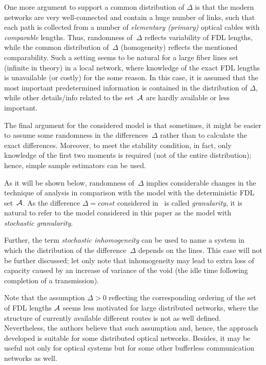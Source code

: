 \begin{multicols}{2}
One more argument to
support a common distribution of $\Delta$ is that the modern
networks are very well-connected and contain a huge number of links,
such that  each path is collected from a number of {\it
elementary (primary)} optical cables with {\it comparable} lengths.
Thus, randomness of~$\Delta$ reflects  variability  of FDL
lengths, while  the common distribution of~$\Delta$ (homogeneity)
reflects the mentioned comparability.  Such a setting seems to be
natural for a large fiber lines set (infinite in theory) in a
local network, where knowledge of the exact FDL lengths  is
unavailable (or costly) for the some reason. In this case, it is assumed
that the most important predetermined information is contained in the
distribution of $\Delta$, while other details/info related to  the
set~$\cal A$ are  hardly  available or less  important.

The final argument for the considered model is that sometimes,  it
might be easier to assume some randomness in the differences~$\Delta$ 
rather than to calculate the exact differences.
Moreover, to meet the stability condition, in fact, only knowledge of the first two
moments is required (not of the entire distribution); hence,
 simple sample  estimators can be used.

As it will be shown below, randomness of~$\Delta$ implies  considerable
changes in the technique of analysis in comparison with the model
with the deterministic FDL set~$\cal A$. As the difference
$\Delta=const$ considered in~\cite{Call} is called \textit{granularity}, 
it is natural to refer to the model considered in this
paper as the model with {\it stochastic granularity}.

Further, the term  {\it stochastic inhomogeneity} can be used to
name a system in which the distribution of the  difference~$\Delta$ 
depends on the lines.  This case will not  be further discussed; let only note that
inhomogeneity may lead to extra  loss of
capacity caused by an increase of variance of the void (the idle
time following completion of a transmission).

Note that the assumption   $\Delta>0$ reflecting the
corresponding ordering of  the set of FDL lengths $\cal A$ seems
less motivated for  large distributed networks, where the structure
of currently available different routes is not as well defined.
Nevertheless, the authors believe that such assumption  and, hence, the
approach developed is suitable for some distributed optical
networks. Besides,  it may be useful not only for optical systems
but for some other bufferless communication networks as well.


\end{multicols}
